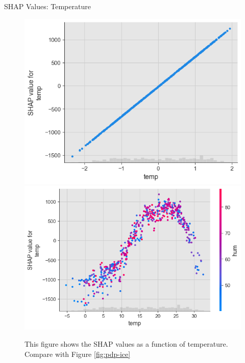 \documentclass[10pt]{beamer}
\begin{document}
\begin{frame}{SHAP Values: Temperature}
\begin{center}
  \begin{figure}
    \includegraphics[scale=0.33]{images/interpretable_ml_119_0.png}
    \includegraphics[scale=0.33]{images/interpretable_ml_131_0.png}
    \caption{This figure shows the SHAP values as a function of temperature. Compare with Figure \ref{fig:pdp-ice}}
  \end{figure}
\end{center}
\end{frame}
\end{document}
